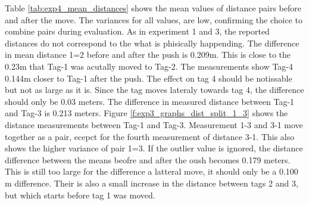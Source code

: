 Table \ref{tab:exp4_mean_distances} shows the mean values of distance pairs before and after the move.
The variances for all values, are low, confirming the choice to combine pairs during evaluation.
As in experiment 1 and 3, the reported distances do not correspond to the what is phisically happending.
The difference in mean distance 1=2 before and after the push is 0.209m.
This is close to the 0.23m that Tag-1 was acutally moved to Tag-2.
The measurements show Tag-4 0.144m closer to Tag-1 after the push.
The effect on tag 4 should be notissable but not as large as it is.
Since the tag moves lateraly towards tag 4, the difference should only be 0.03 meters.
The difference in measured distance between Tag-1 and Tag-3 is 0.213 meters.
Figure \ref{f:exp3_graphs_dist_split_1_3} shows the distance measurements between Tag-1 and Tag-3.
Measurement 1-3 and 3-1 move together as a pair, ecepct for the fourth measurement of distance 3-1.
This also shows the higher variance of pair 1=3.
If the outlier value is ignored, the distance difference between the means beofre and after the oush becomes 0.179 meters. 
This is still too large for the difference a latteral move, it should only be a 0.100 m difference.
Their is also a small increase in the distance between tags 2 and 3, but which starts before tag 1 was moved.


